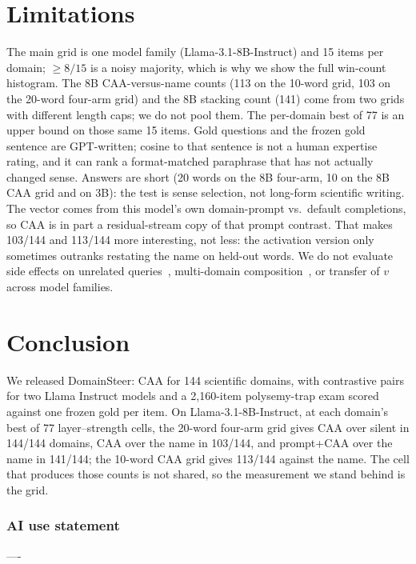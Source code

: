 \documentclass{article} %
\begin{document}
\section{Limitations}

The main grid is one model family (Llama-3.1-8B-Instruct) and 15 items per domain; $\geq 8/15$ is a noisy majority, which is why we show the full win-count histogram.
The 8B CAA-versus-name counts (113 on the 10-word grid, 103 on the 20-word four-arm grid) and the 8B stacking count (141) come from two grids with different length caps; we do not pool them.
The per-domain best of 77 is an upper bound on those same 15 items.
Gold questions and the frozen gold sentence are GPT-written; cosine to that sentence is not a human expertise rating, and it can rank a format-matched paraphrase that has not actually changed sense.
Answers are short (20 words on the 8B four-arm, 10 on the 8B CAA grid and on 3B): the test is sense selection, not long-form scientific writing.
The vector comes from this model's own domain-prompt vs.\ default completions, so CAA is in part a residual-stream copy of that prompt contrast.
That makes 103/144 and 113/144 more interesting, not less: the activation version only sometimes outranks restating the name on held-out words.
We do not evaluate side effects on unrelated queries~\citep{stickland2024kts}, multi-domain composition~\citep{vanderweij2024extending}, or transfer of $v$ across model families.

\section{Conclusion}

We released DomainSteer: CAA for 144 scientific domains, with contrastive pairs for two Llama Instruct models and a 2{,}160-item polysemy-trap exam scored against one frozen gold per item.
On Llama-3.1-8B-Instruct, at each domain's best of 77 layer--strength cells, the 20-word four-arm grid gives CAA over silent in 144/144 domains, CAA over the name in 103/144, and prompt+CAA over the name in 141/144; the 10-word CAA grid gives 113/144 against the name.
The cell that produces those counts is not shared, so the measurement we stand behind is the grid.

\subsubsection*{AI use statement}

----
\end{document}
